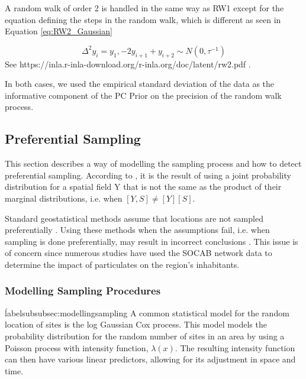 
A random walk of order 2 is handled in the same way as RW1 except for the equation defining the steps in the random walk, which is different as seen in Equation \ref{eq:RW2_Gaussian}

\begin{equation} \label{eq:RW2_Gaussian}
\Delta^2 y_i = y_1, - 2y_{i+1} + y_{i+2} \sim N(0,\tau^{-1})
\end{equation}
See 
https://inla.r-inla-download.org/r-inla.org/doc/latent/rw2.pdf
.

In both cases, we used the empirical standard deviation of the data as the informative component of the PC Prior on the precision of the random walk process.










\subsection{Preferential Sampling} \label{subsec:PreferentialSampling}
This section describes a way of modelling the sampling process and how to detect preferential sampling. 
According to 
\citet{diggle:07}, it is the result of using a joint probability distribution for a spatial field \gls{Y} that is not the same as the product of their marginal distributions, i.e. when $[Y, S] \neq [Y][S]$.  

Standard geostatistical methods assume that locations are not sampled preferentially \citep{diggle2010geostatistical}.  Using these methods when the assumptions fail, i.e. when sampling is done preferentially, may result in incorrect conclusions \citep{isaaks1988spatial}.  This issue is of concern since numerous studies have used the \ac{SOCAB} network data to determine the impact of particulates on the region's inhabitants.

\subsubsection*{Modelling Sampling Procedures}
\'label{subsubsec:modellingsampling}
A common statistical model for the random location of sites is the log Gaussian Cox process.  This model models the probability distribution for the random number of sites in an area by using a Poisson process with intensity function, $\lambda(x)$.  
The resulting intensity function can then have various linear predictors, allowing for its adjustment in space and time.

